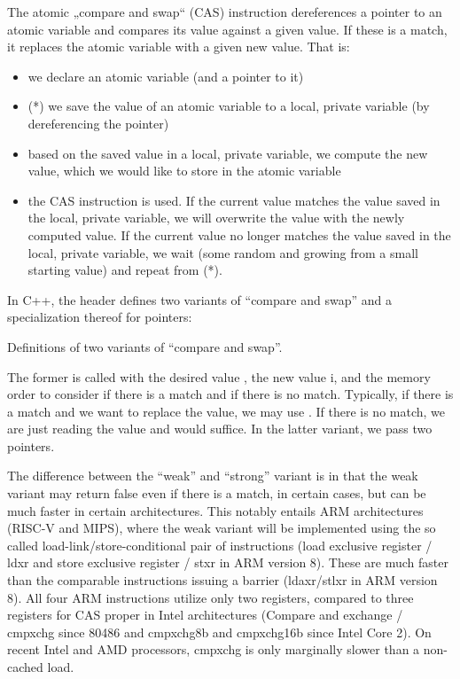 The atomic „compare and swap“ (CAS) instruction dereferences a pointer to an atomic variable and compares its value against a given value. If these is a match, it replaces the atomic variable with a given new value. That is:
\begin{itemize}
\item we declare an atomic variable (and a pointer to it)
\item (*) we save the value of an atomic variable to a local, private variable (by dereferencing the pointer)
\item based on the saved value in a local, private variable, we compute the new value, which we would like to store in the atomic variable
\item the CAS instruction is used. If the current value matches the value saved in the local, private variable, we will overwrite the value with the newly computed value. If the current value no longer matches the value saved in the local, private variable, we wait (some random and growing from a small starting value) and repeat from (*). 
\end{itemize}

In C++, the  header defines two variants of ``compare and swap'' and a specialization thereof for pointers:

\raggedbottom
\begin{codebox}[]{\href{https://godbolt.org/z/}{\ExternalLink}}
\footnotesize Definitions of two variants of ``compare and swap''.
\tcblower
{}
\end{codebox}

The former is called with the desired value , the new value {i}, and the memory order to consider if there is a match and if there is no match. Typically, if there is a match and we want to replace the value, we may use . If there is no match, we are just reading the value and  would suffice. In the latter variant, we pass two pointers. 

The difference between the ``weak'' and ``strong'' variant is in that the weak variant may return false even if there is a match, in certain cases, but can be much faster in certain architectures. This notably entails ARM architectures (RISC-V and MIPS), where the weak variant will be implemented using the so called load-link/store-conditional pair of instructions (load exclusive register / ldxr and store exclusive register / stxr in ARM version 8).
These are much faster than the comparable instructions issuing a barrier (ldaxr/stlxr in ARM version 8).
All four ARM instructions utilize only two registers, compared to three registers for CAS proper in Intel architectures (Compare and exchange / cmpxchg since 80486 and cmpxchg8b and cmpxchg16b since Intel Core 2). On recent Intel and AMD processors, cmpxchg is only marginally slower than a non-cached load.

